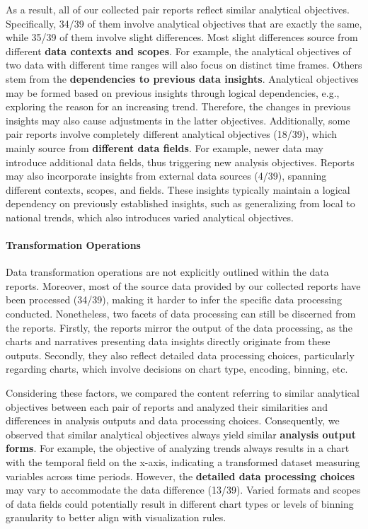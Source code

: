 As a result, all of our collected pair reports reflect similar analytical objectives.
Specifically, 34/39 of them involve analytical objectives that are exactly the same, while 35/39 of them involve slight differences.
Most slight differences source from different \textbf{data contexts and scopes}. 
For example, the analytical objectives of two data with different time ranges will also focus on distinct time frames. 
Others stem from the \textbf{dependencies to previous data insights}. 
Analytical objectives may be formed based on previous insights through logical dependencies, e.g., exploring the reason for an increasing trend. 
Therefore, the changes in previous insights may also cause adjustments in the latter objectives. 
Additionally, some pair reports involve completely different analytical objectives (18/39), which mainly source from \textbf{different data fields}. 
For example, newer data may introduce additional data fields, thus triggering new analysis objectives.
Reports may also incorporate insights from external data sources (4/39), spanning different contexts, scopes, and fields. 
These insights typically maintain a logical dependency on previously established insights, such as generalizing from local to national trends, which also introduces varied analytical objectives. 


\paragraph{Transformation Operations}
Data transformation operations are not explicitly outlined within the data reports. 
Moreover, most of the source data provided by our collected reports have been processed (34/39), making it harder to infer the specific data processing conducted. 
Nonetheless, two facets of data processing can still be discerned from the reports. 
Firstly, the reports mirror the output of the data processing, as the charts and narratives presenting data insights directly originate from these outputs.
Secondly, they also reflect detailed data processing choices, particularly regarding charts, which involve decisions on chart type, encoding, binning, etc. 

Considering these factors, we compared the content referring to similar analytical objectives between each pair of reports and analyzed their similarities and differences in analysis outputs and data processing choices. 
Consequently, we observed that similar analytical objectives always yield similar \textbf{analysis output forms}.
For example, the objective of analyzing trends always results in a chart with the temporal field on the x-axis, indicating a transformed dataset measuring variables across time periods.
However, the \textbf{detailed data processing choices} may vary to accommodate the data difference (13/39). 
Varied formats and scopes of data fields could potentially result in different chart types or levels of binning granularity to better align with visualization rules.

